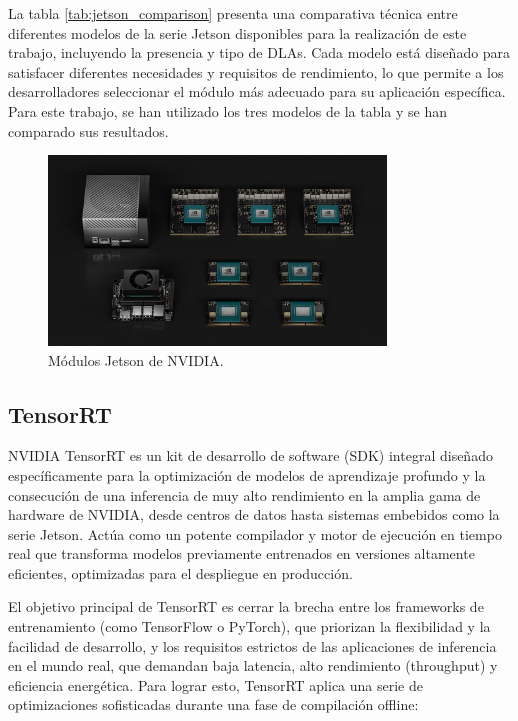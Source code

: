 \documentclass[11pt,spanish,listoffigures,listoftables]{tfgetsinf}
\begin{document}
La tabla \ref{tab:jetson_comparison}\cite{nvidia_jetson_modules} presenta una comparativa técnica entre diferentes modelos de la serie Jetson disponibles para la realización de este trabajo, incluyendo la presencia y tipo de DLAs. Cada modelo está diseñado para satisfacer diferentes necesidades y requisitos de rendimiento, lo que permite a los desarrolladores seleccionar el módulo más adecuado para su aplicación específica. Para este trabajo, se han utilizado los tres modelos de la tabla y se han comparado sus resultados.


\begin{figure}[H]
   \centering
   \includegraphics[width=0.8\textwidth]{images/estado_del_arte/jetson_family.png}
   \caption{Módulos Jetson de NVIDIA.}
   \label{fig:jetson_modules}
\end{figure}

\subsection{TensorRT} \label{sec:tensorrt}
NVIDIA TensorRT es un kit de desarrollo de software (SDK) integral diseñado específicamente para la optimización de modelos de aprendizaje profundo y la consecución de una inferencia de muy alto rendimiento en la amplia gama de hardware de NVIDIA, desde centros de datos hasta sistemas embebidos como la serie Jetson. Actúa como un potente compilador y motor de ejecución en tiempo real que transforma modelos previamente entrenados en versiones altamente eficientes, optimizadas para el despliegue en producción.

El objetivo principal de TensorRT es cerrar la brecha entre los frameworks de entrenamiento (como TensorFlow o PyTorch), que priorizan la flexibilidad y la facilidad de desarrollo, y los requisitos estrictos de las aplicaciones de inferencia en el mundo real, que demandan baja latencia, alto rendimiento (throughput) y eficiencia energética. Para lograr esto, TensorRT aplica una serie de optimizaciones sofisticadas durante una fase de compilación offline:
\end{document}
